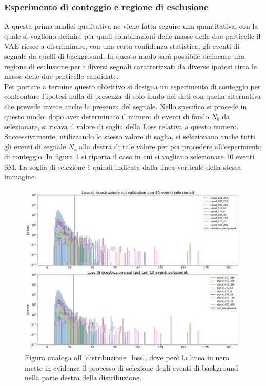 \newpage

\subsubsection{Esperimento di conteggio e regione di esclusione}
\label{esperimento di conteggio e regione di esclusione}

A questa prima analisi qualitativa ne viene fatta seguire una quantitativa, con la quale si vogliono definire per quali combinazioni delle masse delle due particelle il VAE riesce a discriminare, con una certa confidenza statistica, gli eventi di segnale da quelli di background. In questo modo sarà possibile delineare una regione di esclusione per i diversi segnali caratterizzati da diverse ipotesi circa le masse delle due particelle candidate.\\
Per portare a termine questo obiettivo si designa un esperimento di conteggio per confrontare l'ipotesi nulla di presenza di solo fondo nei dati con quella alternativa che prevede invece anche la presenza del segnale. Nello specifico si procede in questo modo: dopo aver determinato il numero di eventi di fondo $N_b$ da selezionare, si ricava il valore di soglia della Loss relativa a questo numero. Successivamente, utilizzando lo stesso valore di soglia, si selezionano anche tutti gli eventi di segnale $N_s$ alla destra di tale valore per poi procedere all'esperimento di conteggio. In figura \ref{distribuzioneLossRiga} si riporta il caso in cui si vogliano selezionare 10 eventi SM. La soglia di selezione è quindi indicata dalla linea verticale della stessa immagine.

\begin{figure}[h!]
	\centering
	\includegraphics[width=0.99\textwidth]{figs/risultati_simulazione/distribuzioneLossRiga.pdf}
	\caption{Figura analoga all \ref{distribuzione_loss}, dove però la linea in nero mette in evidenza il processo di selezione degli eventi di background nella parte destra della distribuzione.}
	\label{distribuzioneLossRiga}
\end{figure}

